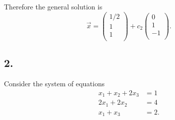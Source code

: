 Therefore the general solution is
\[ 
\Vec{x} = \begin{pmatrix}
1 / 2\\
1\\
1\\
\end{pmatrix} + c_2 \begin{pmatrix}
0\\
1\\
-1\\
\end{pmatrix}
.\]



\subsection*{2.}
Consider the system of equations
\begin{align*}
  x_1 + x_2 + 2x_3 &= 1 \\
  2x_1 + 2x_2 &= 4\\
  x_1 + x_3 &= 2
.\end{align*}

